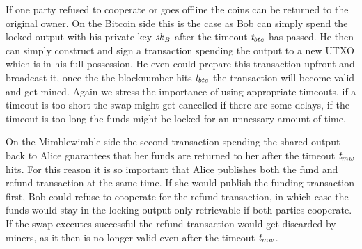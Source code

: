 If one party refused to cooperate or goes offline the coins can be returned to the original owner.
On the Bitcoin side this is the case as Bob can simply spend the locked output with his private key $\mathit{sk}_{\mathit{B}}$ after the timeout $\mathit{t}_{btc}$ has passed.
He then can simply construct and sign a transaction spending the output to a new UTXO which is in his full possession.
He even could prepare this transaction upfront and broadcast it, once the the blocknumber hits $\mathit{t}_{btc}$ the transaction will become valid and get mined.
Again we stress the importance of using appropriate timeouts, if a timeout is too short the swap might get cancelled if there are some delays, if the timeout is too long the funds might be locked for an unnessary amount of time.

On the Mimblewimble side the second transaction spending the shared output back to Alice guarantees that her funds are returned to her after the timeout $\mathit{t}_{mw}$ hits.
For this reason it is so important that Alice publishes both the fund and refund transaction at the same time.
If she would publish the funding transaction first, Bob could refuse to cooperate for the refund transaction, in which case the funds would stay in the locking output only retrievable if both parties cooperate.
If the swap executes successful the refund transaction would get discarded by miners, as it then is no longer valid even after the timeout $\mathit{t}_{mw}$.